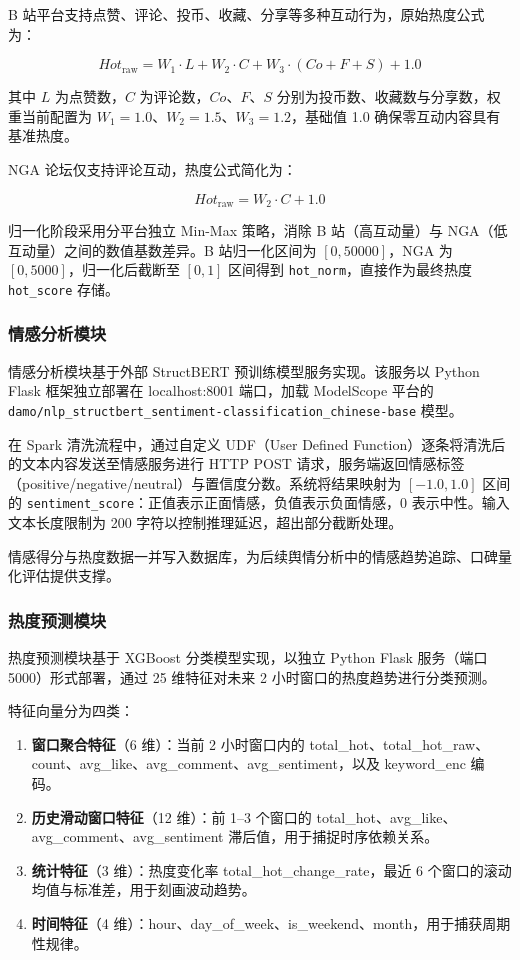 B 站平台支持点赞、评论、投币、收藏、分享等多种互动行为，原始热度公式为：

\[
Hot_{\text{raw}} = W_1 \cdot L + W_2 \cdot C + W_3 \cdot (Co + F + S) + 1.0
\]

其中 $L$ 为点赞数，$C$ 为评论数，$Co$、$F$、$S$ 分别为投币数、收藏数与分享数，权重当前配置为 $W_1{=}1.0$、$W_2{=}1.5$、$W_3{=}1.2$，基础值 1.0 确保零互动内容具有基准热度。

NGA 论坛仅支持评论互动，热度公式简化为：

\[
Hot_{\text{raw}} = W_2 \cdot C + 1.0
\]

归一化阶段采用分平台独立 Min-Max 策略，消除 B 站（高互动量）与 NGA（低互动量）之间的数值基数差异。B 站归一化区间为 $[0, 50000]$，NGA 为 $[0, 5000]$，归一化后截断至 $[0, 1]$ 区间得到 \texttt{hot\_norm}，直接作为最终热度 \texttt{hot\_score} 存储。

\subsubsection{情感分析模块}

情感分析模块基于外部 StructBERT 预训练模型服务实现。该服务以 Python Flask 框架独立部署在 localhost:8001 端口，加载 ModelScope 平台的 \texttt{damo/nlp\_structbert\_sentiment-classification\_chinese-base} 模型。

在 Spark 清洗流程中，通过自定义 UDF（User Defined Function）逐条将清洗后的文本内容发送至情感服务进行 HTTP POST 请求，服务端返回情感标签（positive/negative/neutral）与置信度分数。系统将结果映射为 $[-1.0, 1.0]$ 区间的 \texttt{sentiment\_score}：正值表示正面情感，负值表示负面情感，0 表示中性。输入文本长度限制为 200 字符以控制推理延迟，超出部分截断处理。

情感得分与热度数据一并写入数据库，为后续舆情分析中的情感趋势追踪、口碑量化评估提供支撑。

\subsubsection{热度预测模块}

热度预测模块基于 XGBoost 分类模型实现，以独立 Python Flask 服务（端口 5000）形式部署，通过 25 维特征对未来 2 小时窗口的热度趋势进行分类预测。

特征向量分为四类：
\begin{enumerate}
    \item \textbf{窗口聚合特征}（6 维）：当前 2 小时窗口内的 total\_hot、total\_hot\_raw、count、avg\_like、avg\_comment、avg\_sentiment，以及 keyword\_enc 编码。
    \item \textbf{历史滑动窗口特征}（12 维）：前 1--3 个窗口的 total\_hot、avg\_like、avg\_comment、avg\_sentiment 滞后值，用于捕捉时序依赖关系。
    \item \textbf{统计特征}（3 维）：热度变化率 total\_hot\_change\_rate，最近 6 个窗口的滚动均值与标准差，用于刻画波动趋势。
    \item \textbf{时间特征}（4 维）：hour、day\_of\_week、is\_weekend、month，用于捕获周期性规律。
\end{enumerate}


